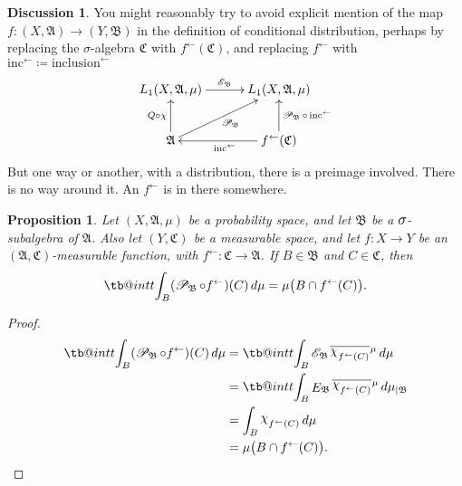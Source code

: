 \documentclass[
twoside=true,
paper=letter,
fontsize=11pt,
pagesize=auto,
leqno,
openany,
headsepline,
overfullrule,
]{scrbook}
\makeatletter
\theoremstyle{plain}
\theoremstyle{plain}
\newtheorem{prop}[thm]{Proposition}
\theoremstyle{definition}
\newtheorem{discussion}[thm]{Discussion}
\theoremstyle{bfnoteitalic}
\theoremstyle{bfnoteroman}
\newcommand{\sigalg}[1]{\mathfrak{#1}}
\newcommand{\cali}[1]{\mathscr{#1}}
\newcommand{\definedby}{\coloneqq}
\newcommand{\kondexpsub}[2]
{\mathop{E}\nolimits_{#2}\hspace{-1pt}#1}
\newcommand{\condexpsub}[2]
{\mathop{\cali{E}\hspace{-1.5pt}}\nolimits_{#2}\hspace{-1pt}#1}
\newcommand{\condexpop}[1]{\mathop{\cali{E}\hspace{-1pt}}\nolimits_{#1}}
\newcommand{\condprobop}[1]{\mathop{\cali{P}\hspace{-1pt}}\nolimits_{#1}}
\newcommand{\textsigma}{\hbox{\large{$\sigma$}}\kern-1pt}
\newcommand{\charfunction}[1]{{\raisebox{2pt}{$\chi$}}_{#1}}
\newcommand{\restrictedto}[1]{_{\lvert#1}\kern-1.5pt}
\newcommand{\preimage}[1]{#1^{\leftarrow}}
\newcommand{\meets}{\cap}
\newcommand{\sigmaalgebra}{\sigalg{A}}
\newcommand{\sigmaalgebraii}{\sigalg{B}}
\newcommand{\sigmaalgebraiii}{\sigalg{C}}
\newcommand{\Lone}{L_1(\measurespace, \sigmaalgebra, \measure)}
\newcommand{\function}{f}
\newcommand{\measurespace}{X}
\newcommand{\measurespaceii}{Y}
\newcommand{\measure}{\mu}
\newcommand{\setii}{B}
\newcommand{\setiii}{C}
\newcommand*\xbar[1]{%
   \hbox{%
     \vbox{%
       \hrule height 0.4pt %
       \kern0.4ex%
       \hbox{%
         \ensuremath{#1}%
       }%
     }%
   }%
}
\newcommand\tint{\mathop{\mathpalette\tb@int{t}}\!\int}
\newcommand\tb@int[2]{%
  \sbox\z@{$\m@th#1\int$}%
  \if#2t%
    \rlap{\hbox to\wd\z@{%
      \hfil
      \vrule width .35em height \dimexpr\ht\z@+1.4pt\relax depth -\dimexpr\ht\z@+1pt\relax
      \kern.05em %
    }}
  \else
    \rlap{\hbox to\wd\z@{%
      \vrule width .35em height -\dimexpr\dp\z@+1pt\relax depth \dimexpr\dp\z@+1.4pt\relax
      \hfil
    }}
  \fi
}
\newcommand{\lebclass}[1]{\hspace{.5pt}\xbar{#1}\hspace{0.5pt}}
\newcommand{\ellclass}[2]{\lebclass{#1}^{#2}}
\newcommand{\inducedint}{\tint}
\makeatother
\begin{document}
\begin{discussion}\label{avoid_function}
You might reasonably try to avoid explicit mention of the map 
$\function:(\measurespace,\sigmaalgebra)\to (\measurespaceii,\sigmaalgebraii)$
in the definition of conditional distribution, perhaps by replacing the \textsigma\hyp{}algebra 
$\sigmaalgebraiii$ with $\preimage{\function}(\sigmaalgebraiii)$, and replacing
$\preimage{\function}$ with 
$\preimage{\text{inc}} \definedby \preimage{\text{inclusion}}$
\[
\xymatrix@C=30pt{ 
\Lone \ar[r]^{\condexpop{\sigmaalgebraii}} 
& \Lone 
\\
\sigmaalgebra 
\ar[u]^-{Q\circ\chi} 
\ar[ur]_{\condprobop{\sigmaalgebraii}} 
& \preimage{\function}(\sigmaalgebraiii) \ar[l]^{\preimage{\text{inc}}} 
\ar[u]_{\condprobop{\sigmaalgebraii}\circ\,\preimage{\text{inc}}}
}
\]
But one way or another, with a distribution, there is a preimage involved.
There is no way around it.  An $\preimage{\function}$ is in there somewhere.
\end{discussion}



\begin{prop}\label{conditional_probability_of_a_set}
Let $(\measurespace, \sigmaalgebra, \measure)$ be a probability space, and let $\sigmaalgebraii$ be a $\textsigma$-subalgebra of $\sigmaalgebra$. Also let $(\measurespaceii, \sigmaalgebraiii)$ be a measurable space, and let 
$\function:\measurespace\to\measurespaceii$ be an
$(\sigmaalgebra, \sigmaalgebraiii)$\hyp{}measurable function, with
$\preimage{\function} : \sigmaalgebraiii \to \sigmaalgebra$.  
If $\setii\in\sigmaalgebraii$ and $\setiii\in\sigmaalgebraiii$, then
\[
\inducedint_\setii (\condprobop{\sigmaalgebraii}\circ \preimage{\function})(\setiii)\,d\measure
=
\measure\bigl(\setii\meets\preimage{\function}(\setiii)\bigr).
\]
\end{prop}


\begin{proof}
\begin{align*}
\inducedint_\setii (\condprobop{\sigmaalgebraii}\circ \preimage{\function})(\setiii)\,d\measure
&= \inducedint_\setii 
\condexpsub{\ellclass{\charfunction{\preimage{\function}(\setiii)}}{\measure}}{\sigmaalgebraii}
\,d\measure \\
&= \inducedint_\setii 
\kondexpsub{\ellclass{\charfunction{\preimage{\function}(\setiii)}}{\measure}}{\sigmaalgebraii}
\,d\measure\restrictedto{\sigmaalgebraii} \\
&= \int_\setii \charfunction{\preimage{f}(\setiii)}\,d\mu \\
&= \measure\bigl(\setii\meets\preimage{\function}(\setiii)\bigr).\\
\end{align*}
\end{proof}
\end{document}
